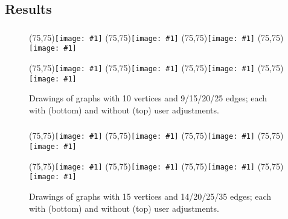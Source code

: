 \subsection{Results}
\label{subsect:application-results}

\newcommand{\drawing}[3]{\setlength\fboxsep{0pt}\colorbox{gray!10}{\makebox(75,75){\texttt{[image: \#1]}}}}

\begin{frame}
  \frametitle{\insertsubsection}
  \begin{figure}
    \centerline{
      \drawing{Resources/Graph-10-09-1.pdf}{369}{291}\hspace{4pt}%
      \drawing{Resources/Graph-10-15-1.pdf}{267}{320}\hspace{4pt}%
      \drawing{Resources/Graph-10-20-1.pdf}{191}{145}\hspace{4pt}%
      \drawing{Resources/Graph-10-25-1.pdf}{122}{151}%
    }
    \vspace{3pt}
    \centerline{
      \drawing{Resources/Graph-10-09-2.pdf}{443}{196}\hspace{4pt}%
      \drawing{Resources/Graph-10-15-2.pdf}{253}{287}\hspace{4pt}%
      \drawing{Resources/Graph-10-20-2.pdf}{203}{165}\hspace{4pt}%
      \drawing{Resources/Graph-10-25-2.pdf}{203}{129}%
    }
    \caption{Drawings of graphs with 10 vertices and 9/15/20/25 edges; each with (bottom) and without (top) user adjustments.}
  \end{figure}
\end{frame}

\begin{frame}
  \frametitle{\insertsubsection}
  \begin{figure}
    \centerline{
      \drawing{Resources/Graph-15-14-1.pdf}{356}{362}\hspace{4pt}%
      \drawing{Resources/Graph-15-20-1.pdf}{356}{278}\hspace{4pt}%
      \drawing{Resources/Graph-15-25-1.pdf}{311}{248}\hspace{4pt}%
      \drawing{Resources/Graph-15-35-1.pdf}{276}{232}%
    }
    \vspace{3pt}
    \centerline{
      \drawing{Resources/Graph-15-14-2.pdf}{564}{404}\hspace{4pt}%
      \drawing{Resources/Graph-15-20-2.pdf}{341}{362}\hspace{4pt}%
      \drawing{Resources/Graph-15-25-2.pdf}{306}{271}\hspace{4pt}%
      \drawing{Resources/Graph-15-35-2.pdf}{262}{288}%
    }
    \caption{Drawings of graphs with 15 vertices and 14/20/25/35 edges; each with (bottom) and without (top) user adjustments.}
  \end{figure}
\end{frame}

